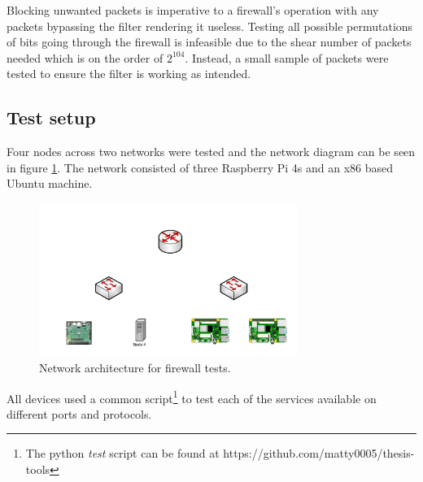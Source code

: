 Blocking unwanted packets is imperative to a firewall's operation with any packets bypassing the filter rendering it useless. Testing all possible permutations of bits going through the firewall is infeasible due to the shear number of packets needed which is on the order of $2^104$. Instead, a small sample of packets were tested to ensure the filter is working as intended.

\subsection{Test setup}

Four nodes across two networks were tested and the network diagram can be seen in figure \ref{fig:network_layout_test}. The network consisted of three Raspberry Pi 4s and an x86 based Ubuntu machine. 



\begin{figure}[h]
    \centering
    \includegraphics[width=0.75\textwidth]{Images/NetworkArchitecture.png}
    \caption[Network architecture for firewall tests]{Network architecture for firewall tests.}
    \label{fig:network_layout_test}
\end{figure}

All devices used a common script\footnote[1]{The python \textit{test} script can be found at https://github.com/matty0005/thesis-tools} to test each of the services available on different ports and protocols. 







